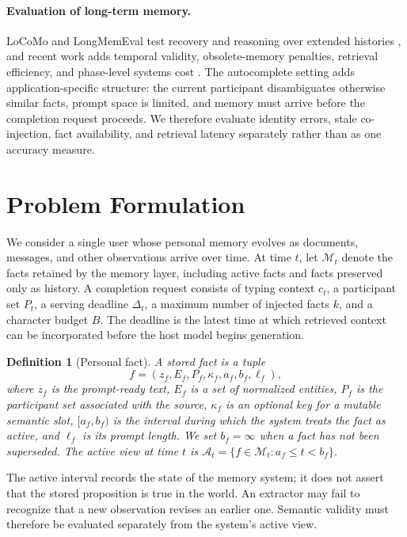 \documentclass[letterpaper]{article} %
\newtheorem{definition}{Definition}
\begin{document}
\paragraph{Evaluation of long-term memory.} LoCoMo and LongMemEval test recovery and reasoning over extended histories \citep{maharana2024evaluating,wu2024longmemeval}, and recent work adds temporal validity, obsolete-memory penalties, retrieval efficiency, and phase-level systems cost \citep{uddin2026memora,su2026tsm,huang2026licomemory,omri2026agentmemory}. The autocomplete setting adds application-specific structure: the current participant disambiguates otherwise similar facts, prompt space is limited, and memory must arrive before the completion request proceeds. We therefore evaluate identity errors, stale co-injection, fact availability, and retrieval latency separately rather than as one accuracy measure.

\section{Problem Formulation}

We consider a single user whose personal memory evolves as documents, messages, and other observations arrive over time. At time $t$, let $\mathcal{M}_t$ denote the facts retained by the memory layer, including active facts and facts preserved only as history. A completion request consists of typing context $c_t$, a participant set $P_t$, a serving deadline $\Delta_t$, a maximum number of injected facts $k$, and a character budget $B$. The deadline is the latest time at which retrieved context can be incorporated before the host model begins generation.

\begin{definition}[Personal fact]
A stored fact is a tuple
\begin{equation}
f=(z_f,E_f,P_f,\kappa_f,a_f,b_f,\ell_f),
\end{equation}
where $z_f$ is the prompt-ready text, $E_f$ is a set of normalized entities, $P_f$ is the participant set associated with the source, $\kappa_f$ is an optional key for a mutable semantic slot, $[a_f,b_f)$ is the interval during which the system treats the fact as active, and $\ell_f$ is its prompt length. We set $b_f=\infty$ when a fact has not been superseded. The active view at time $t$ is $\mathcal{A}_t=\{f\in\mathcal{M}_t:a_f\le t<b_f\}$.
\end{definition}

The active interval records the state of the memory system; it does not assert that the stored proposition is true in the world. An extractor may fail to recognize that a new observation revises an earlier one. Semantic validity must therefore be evaluated separately from the system's active view.
\end{document}
